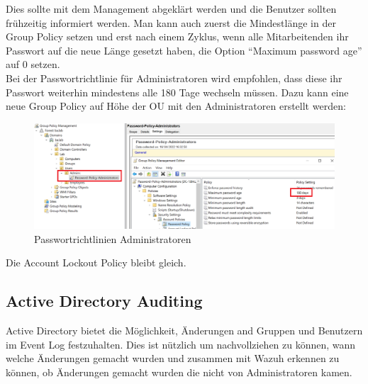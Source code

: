Dies sollte mit dem Management abgeklärt werden und die Benutzer sollten frühzeitig informiert werden.
Man kann auch zuerst die Mindestlänge in der Group Policy setzen und erst nach einem Zyklus, wenn alle Mitarbeitenden ihr Passwort auf die neue Länge gesetzt haben, die Option ``Maximum password age'' auf 0 setzen. \\

Bei der Passwortrichtlinie für Administratoren wird empfohlen, dass diese ihr Passwort weiterhin mindestens alle 180 Tage wechseln müssen.
Dazu kann eine neue Group Policy auf Höhe der OU mit den Administratoren erstellt werden:
\begin{figure}[H]
    \centering
    \includegraphics[width=0.7\linewidth]{../img/IAM/admin-password-policy.png}
    \caption{Passwortrichtlinien Administratoren}
\end{figure}
Die Account Lockout Policy bleibt gleich.

\subsection{Active Directory Auditing}
Active Directory bietet die Möglichkeit, Änderungen and Gruppen und Benutzern im Event Log festzuhalten.
Dies ist nützlich um nachvollziehen zu können, wann welche Änderungen gemacht wurden und zusammen mit Wazuh erkennen zu können, ob Änderungen gemacht wurden die nicht von Administratoren kamen.\\

